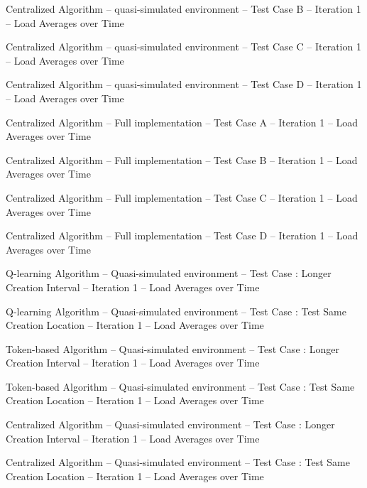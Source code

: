    {Centralized Algorithm -- quasi-simulated environment -- Test Case B --
   Iteration 1 -- Load Averages over Time}

   {Centralized Algorithm -- quasi-simulated environment -- Test Case C --
   Iteration 1 -- Load Averages over Time}

   {Centralized Algorithm -- quasi-simulated environment -- Test Case D --
   Iteration 1 -- Load Averages over Time}

   {Centralized Algorithm -- Full implementation -- Test Case A --
   Iteration 1 -- Load Averages over Time}

   {Centralized Algorithm -- Full implementation -- Test Case B --
   Iteration 1 -- Load Averages over Time}

   {Centralized Algorithm -- Full implementation -- Test Case C --
   Iteration 1 -- Load Averages over Time}

   {Centralized Algorithm -- Full implementation -- Test Case D --
   Iteration 1 -- Load Averages over Time}


   {Q-learning Algorithm -- Quasi-simulated environment --
   Test Case : Longer Creation Interval -- Iteration 1 --
   Load Averages over Time}

   {Q-learning Algorithm -- Quasi-simulated environment --
   Test Case : Test Same Creation Location -- Iteration 1 --
   Load Averages over Time}

   {Token-based Algorithm -- Quasi-simulated environment --
   Test Case : Longer Creation Interval -- Iteration 1 --
   Load Averages over Time}

   {Token-based Algorithm -- Quasi-simulated environment --
   Test Case : Test Same Creation Location -- Iteration 1 --
   Load Averages over Time}

   {Centralized Algorithm -- Quasi-simulated environment --
   Test Case : Longer Creation Interval -- Iteration 1 --
   Load Averages over Time}

   {Centralized Algorithm -- Quasi-simulated environment --
   Test Case : Test Same Creation Location -- Iteration 1 --
   Load Averages over Time}


